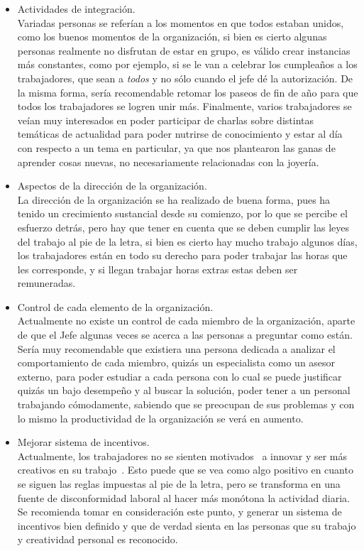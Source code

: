 \begin{itemize}
	\item Actividades de integración.\\
	Variadas personas se referían a los momentos en que todos estaban unidos, como los buenos
	momentos de la organización, si bien es cierto algunas personas realmente no disfrutan de estar
	en grupo, es válido crear instancias más constantes, como por ejemplo, si se le van a celebrar los cumpleaños
	a los trabajadores, que sean a \emph{todos} y no sólo cuando el jefe dé la
    autorización\cite{integracion}.
	De la misma forma, sería recomendable retomar los paseos de fin de año para que todos los trabajadores se
	logren unir más.
	Finalmente, varios trabajadores se veían muy interesados en poder participar de charlas sobre distintas
	temáticas de actualidad para poder nutrirse de conocimiento y estar al día con respecto a un tema en particular,
	ya que nos plantearon las ganas de aprender cosas nuevas, no necesariamente relacionadas con la joyería.
	
	\item Aspectos de la dirección de la organización. \\
	La dirección de la organización se ha realizado de buena forma, pues ha tenido un crecimiento sustancial desde
	su comienzo, por lo que se percibe el esfuerzo detrás, pero hay que tener en cuenta que se deben cumplir
	las leyes del trabajo al pie de la letra, si bien es cierto hay mucho trabajo algunos días, los trabajadores
	están en todo su derecho para poder trabajar las horas que les corresponde, y si llegan trabajar horas extras
	estas deben ser remuneradas.
	
	\item Control de cada elemento de la organización. \\
	Actualmente no existe un control de cada miembro de la organización, aparte de que el Jefe algunas veces
	se acerca a las personas a preguntar como están.
	Sería muy recomendable que existiera una persona dedicada a analizar el comportamiento de cada miembro,
	quizás un especialista como un asesor externo, para poder estudiar a cada persona con lo cual se puede
	justificar quizás un bajo desempeño y al buscar la solución, poder tener a un personal trabajando cómodamente,
	sabiendo que se preocupan de sus problemas y con lo mismo la productividad de la organización se verá en aumento.


    \item Mejorar sistema de incentivos.\\
    Actualmente, los trabajadores no se sienten motivados~\cite{motivacion} a innovar y ser más
    creativos en su trabajo~\cite{creatividad}. Esto puede que se vea como algo positivo en
    cuanto se siguen las reglas impuestas al pie de la letra, pero se
    transforma en una fuente de disconformidad laboral al hacer más monótona
    la actividad diaria. Se recomienda tomar en consideración este punto, y
    generar un sistema de incentivos bien definido y que de verdad sienta en
    las personas que su trabajo y creatividad personal es reconocido.\\


\end{itemize}
